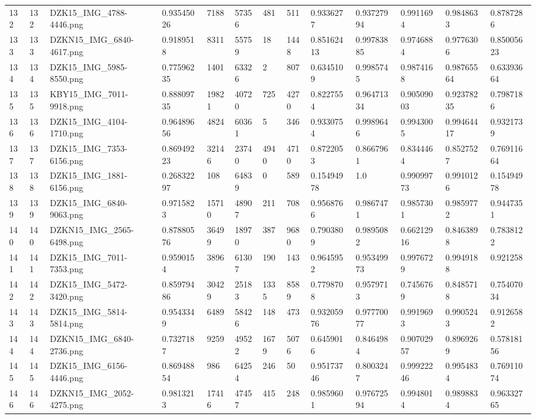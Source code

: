 \documentclass[11pt, a4paper, twoside]{report}
\begin{document}
\begin{longtable}[c]{@{}lllllllllllll@{}}
132 & 132 & DZK15\_IMG\_4788-4446.png & 0.93545026 & 7188 & 57356 & 481 & 511 & 0.9336277 & 0.93727994 & 0.9911694 & 0.9848633 & 0.8787286 \\
133 & 133 & DZKN15\_IMG\_6840-4617.png & 0.9189518 & 8311 & 55759 & 18 & 1448 & 0.85162413 & 0.99783885 & 0.9746884 & 0.9776306 & 0.85005623 \\
134 & 134 & DZK15\_IMG\_5985-8550.png & 0.77596235 & 1401 & 63326 & 2 & 807 & 0.6345109 & 0.9985745 & 0.9874168 & 0.98765564 & 0.63393664 \\
135 & 135 & KBY15\_IMG\_7011-9918.png & 0.88809735 & 19821 & 40720 & 725 & 4270 & 0.8227554 & 0.96471334 & 0.90509003 & 0.92378235 & 0.7987186 \\
136 & 136 & DZK15\_IMG\_4104-1710.png & 0.96489656 & 4824 & 60361 & 5 & 346 & 0.9330754 & 0.9989646 & 0.9943005 & 0.99464417 & 0.9321739 \\
137 & 137 & DZK15\_IMG\_7353-6156.png & 0.86949223 & 32146 & 23740 & 4940 & 4710 & 0.8722053 & 0.8667961 & 0.8344464 & 0.8527527 & 0.76911664 \\
138 & 138 & DZK15\_IMG\_1881-6156.png & 0.26832297 & 108 & 64839 & 0 & 589 & 0.15494978 & 1.0 & 0.99099773 & 0.9910126 & 0.15494978 \\
139 & 139 & DZK15\_IMG\_6840-9063.png & 0.9715823 & 15710 & 48907 & 211 & 708 & 0.9568766 & 0.9867471 & 0.9857301 & 0.9859772 & 0.9447351 \\
140 & 140 & DZKN15\_IMG\_2565-6498.png & 0.87880576 & 36499 & 18970 & 387 & 9680 & 0.7903809 & 0.9895082 & 0.66212916 & 0.8463898 & 0.7838122 \\
141 & 141 & DZK15\_IMG\_7011-7353.png & 0.9590154 & 3896 & 61307 & 190 & 143 & 0.9645952 & 0.95349973 & 0.9976729 & 0.9949188 & 0.921258 \\
142 & 142 & DZK15\_IMG\_5472-3420.png & 0.85979486 & 30429 & 25183 & 1335 & 8589 & 0.7798708 & 0.9579713 & 0.7456769 & 0.8485718 & 0.75407034 \\
143 & 143 & DZK15\_IMG\_5814-5814.png & 0.9543349 & 6489 & 58426 & 148 & 473 & 0.93205976 & 0.97770077 & 0.9919693 & 0.9905243 & 0.9126582 \\
144 & 144 & DZKN15\_IMG\_6840-2736.png & 0.7327187 & 9259 & 49522 & 1679 & 5076 & 0.6459016 & 0.8464984 & 0.90702957 & 0.8969269 & 0.57818156 \\
145 & 145 & DZK15\_IMG\_6156-4446.png & 0.86948854 & 986 & 64254 & 246 & 50 & 0.95173746 & 0.8003247 & 0.99922246 & 0.9954834 & 0.76911074 \\
146 & 146 & DZKN15\_IMG\_2052-4275.png & 0.9813213 & 17416 & 47457 & 415 & 248 & 0.9859601 & 0.97672594 & 0.9948014 & 0.9898834 & 0.96332765 \\

\end{longtable}
\end{document}
